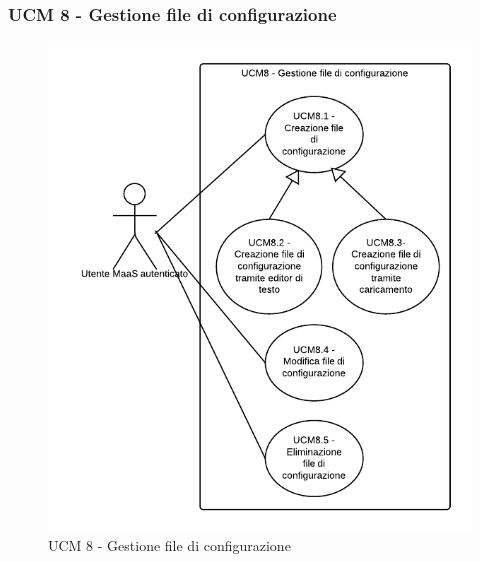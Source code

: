 \subsubsection{UCM 8 - Gestione file di configurazione} 
    \begin{figure}[H]
      \begin{center}
      \includegraphics[width=12cm]{UML/UCM 8 - Gestione file di configurazione.png}
      \caption{UCM 8 - Gestione file di configurazione}
      \end{center} 
    \end{figure}  
    

